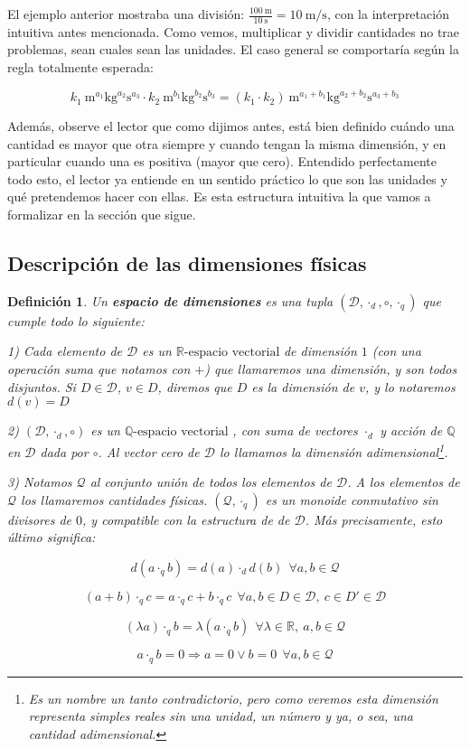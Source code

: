 \documentclass{article}
\def\rev{$\mathbb{R} \mbox{-espacio vectorial } $}
\def\qev{$\mathbb{Q} \mbox{-espacio vectorial } $}
\def\Dimensions{\mathcal D}
\def\Quantities{\mathcal Q}
\newtheorem{definicion}{{\sc Definición}}
\begin{document}
El ejemplo anterior mostraba una división: $\frac{\SI{100}{\meter}}{\SI{10}{\second}} = \SI{10}{\meter\per\second}$, con la
interpretación intuitiva antes mencionada. Como vemos, multiplicar y dividir cantidades no trae problemas, sean cuales sean
las unidades. El caso general se comportaría según la regla totalmente esperada:

$$k_1 \ \si{\meter}^{a_1}\si{\kilogram}^{a_2}\si{\second}^{a_3} \cdot k_2 \ \si{\meter}^{b_1}\si{\kilogram}^{b_2}\si{\second}^{b_3} =
 (k_1 \cdot k_2) \ \si{\meter}^{a_1 + b_1}\si{\kilogram}^{a_2+b_2}\si{\second}^{a_3+b_3}$$

Además, observe el lector que como dijimos antes, está bien definido cuándo una cantidad es mayor que otra siempre y cuando tengan
la misma dimensión, y en particular cuando una es positiva (mayor que cero). Entendido perfectamente todo esto, el lector ya entiende en un
sentido práctico lo que son las unidades y qué pretendemos hacer con ellas. Es esta estructura intuitiva la que vamos a formalizar
en la sección que sigue.

\subsection{Descripción de las dimensiones físicas}

\begin{definicion}
    Un \textbf{espacio de dimensiones} es una tupla $(\Dimensions,\cdot_d, \circ, \cdot_q)$ que cumple todo lo siguiente:
    
    1) Cada elemento de $\Dimensions$ es un \rev de dimensión $1$ (con una operación suma que notamos con $+$) que llamaremos una dimensión, y son todos disjuntos. Si $D \in \Dimensions$, $v \in D$, diremos que $D$ es la dimensión de $v$,
    y lo notaremos $d(v) = D$
    
    2) $(\Dimensions, \cdot_d, \circ)$ es un \qev, con suma de vectores $\cdot_d$ y acción de $\mathbb{Q}$ en $\Dimensions$ dada por $\circ$.
    Al vector cero de $\Dimensions$ lo llamamos la dimensión adimensional\footnote{Es un nombre un tanto contradictorio, pero como veremos esta dimensión representa simples reales sin una unidad, un número y ya, o sea, una cantidad adimensional.}.
     
    3) Notamos $\Quantities$ al conjunto unión de todos los elementos de $\Dimensions$. A los elementos de $\Quantities$ los llamaremos cantidades físicas. $(\Quantities, \cdot_q)$ es un monoide conmutativo
    sin divisores de $0$, y compatible con la estructura de de $\Dimensions$. Más precisamente, esto último significa:
    
    $$d(a \cdot_q b) = d(a) \cdot_d d(b) \ \  \forall a,b \in \Quantities$$
    
    $$(a+b) \cdot_q c = a \cdot_q c + b \cdot_q c \ \  \forall a,b \in D \in \Dimensions, \ c \in D' \in \Dimensions$$
    
    $$(\lambda a) \cdot_q b = \lambda (a \cdot_q b) \ \ \forall \lambda \in \mathbb{R}, \ a,b \in \Quantities$$
    
    $$a \cdot_q b = 0 \Rightarrow a = 0 \lor b = 0 \ \ \forall a,b \in \Quantities$$
    
\end{definicion}
\end{document}
